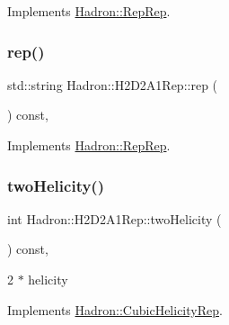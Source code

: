 Implements \mbox{\hyperlink{structHadron_1_1RepRep_ab3213025f6de249f7095892109575fde}{Hadron\+::\+Rep\+Rep}}.

\mbox{\label{structHadron_1_1H2D2A1Rep_a3280d932c7c579f85dedbde3a8e0f36f}} 
\subsubsection{\texorpdfstring{rep()}{rep()}\hspace{0.1cm}{\footnotesize\ttfamily [5/5]}}
{\footnotesize\ttfamily std\+::string Hadron\+::\+H2\+D2\+A1\+Rep\+::rep (\begin{DoxyParamCaption}{ }\end{DoxyParamCaption}) const\hspace{0.3cm}{\ttfamily [inline]}, {\ttfamily [virtual]}}



Implements \mbox{\hyperlink{structHadron_1_1RepRep_ab3213025f6de249f7095892109575fde}{Hadron\+::\+Rep\+Rep}}.

\mbox{\label{structHadron_1_1H2D2A1Rep_a9e33338f0582361895bc7b7853741335}} 
\subsubsection{\texorpdfstring{twoHelicity()}{twoHelicity()}\hspace{0.1cm}{\footnotesize\ttfamily [1/3]}}
{\footnotesize\ttfamily int Hadron\+::\+H2\+D2\+A1\+Rep\+::two\+Helicity (\begin{DoxyParamCaption}{ }\end{DoxyParamCaption}) const\hspace{0.3cm}{\ttfamily [inline]}, {\ttfamily [virtual]}}

2 $\ast$ helicity 

Implements \mbox{\hyperlink{structHadron_1_1CubicHelicityRep_af507aa56fc2747eacc8cb6c96db31ecc}{Hadron\+::\+Cubic\+Helicity\+Rep}}.

\mbox{\label{structHadron_1_1H2D2A1Rep_a9e33338f0582361895bc7b7853741335}} 
